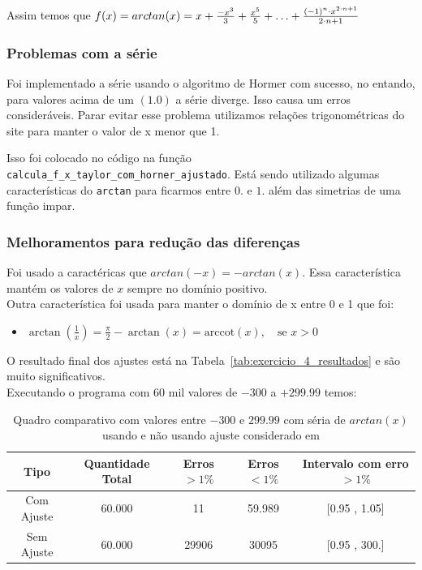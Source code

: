 Assim temos que $f(x) = arctan(x) = x + \frac{-x^3}{3} + \frac{x^5}{5} + \mathellipsis + \frac{(-1)^n \cdot x^{2 \cdot n + 1}}{2 \cdot n + 1} $

\subsubsection{Problemas com a série}

Foi implementado a série usando o algoritmo de Hormer com sucesso, no entando, para valores acima de um $(1.0)$ a série diverge.
Isso causa um erros consideráveis. Parar evitar esse problema utilizamos relações trigonométricas do site \cite{site-geek} para manter o valor de x menor que 1.

Isso foi colocado no código na função \texttt{calcula\_f\_x\_taylor\_com\_horner\_ajustado}. Está sendo utilizado algumas características do \texttt{arctan} para ficarmos entre $0.$ e $1.$ além das simetrias de uma função impar.

\subsubsection{Melhoramentos para redução das diferenças}
\label{sec:melhoramentos-serie-arctan}
Foi usado a caractéricas que $arctan(-x) = -arctan(x)$. Essa característica mantém os valores de $x$ sempre no domínio positivo.\\
Outra característica foi usada para manter o domínio de x entre 0 e 1 que foi:
\begin{itemize}
    \item[] $\arctan\left(\frac{1}{x}\right) = \frac{\pi}{2} - \arctan(x) = \mathrm{arccot}(x), \quad \text{se } x > 0$
\end{itemize}

O resultado final dos ajustes está na Tabela~\ref{tab:exercicio_4_resultados} e são muito significativos.\\

Executando o programa com 60 mil valores de $-300$ a $+299.99$ temos:

\begin{table}[h!]
    \centering
    \caption{Quadro comparativo com valores entre $-300$ e $299.99$ com séria de $arctan(x)$ usando e não usando ajuste considerado em \cite{site-geek}}
    \label{tab:exercicio_4_critica_1}
    \begin{tabular}{|c|c|c|c|c|}
        \hline
        \textbf{Tipo} & \textbf{Quantidade Total} & \textbf{Erros $>1\%$} & \textbf{Erros $<1\%$} & \textbf{Intervalo com erro $>1 \%$} \\
        \hline
        Com Ajuste & 60.000 & 11 & 59.989 & [0.95 , 1.05] \\
        Sem Ajuste & 60.000 & 29906 & 30095 & [0.95 , 300.] \\
        \hline
    \end{tabular}
\end{table}

